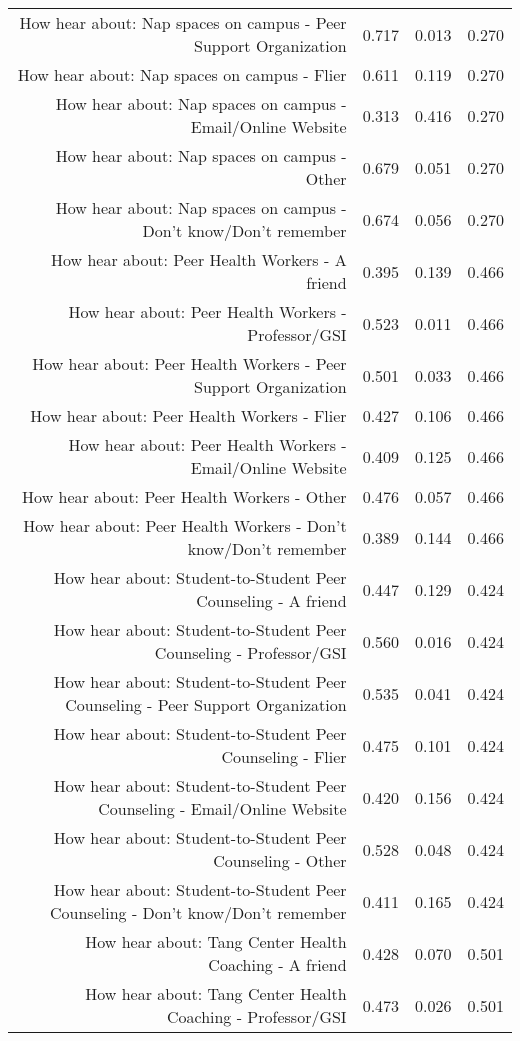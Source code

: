 \documentclass{article}\usepackage[]{graphicx}\usepackage[]{color}
\begin{document}
\begin{table}[ht]
\begin{tabular}{rrrr}
  How hear about: Nap spaces on campus - Peer Support Organization & 0.717 & 0.013 & 0.270 \\ 
  How hear about: Nap spaces on campus - Flier & 0.611 & 0.119 & 0.270 \\ 
  How hear about: Nap spaces on campus - Email/Online Website & 0.313 & 0.416 & 0.270 \\ 
  How hear about: Nap spaces on campus - Other & 0.679 & 0.051 & 0.270 \\ 
  How hear about: Nap spaces on campus - Don't know/Don't remember & 0.674 & 0.056 & 0.270 \\ 
  How hear about: Peer Health Workers - A friend & 0.395 & 0.139 & 0.466 \\ 
  How hear about: Peer Health Workers - Professor/GSI & 0.523 & 0.011 & 0.466 \\ 
  How hear about: Peer Health Workers - Peer Support Organization & 0.501 & 0.033 & 0.466 \\ 
  How hear about: Peer Health Workers - Flier & 0.427 & 0.106 & 0.466 \\ 
  How hear about: Peer Health Workers - Email/Online Website & 0.409 & 0.125 & 0.466 \\ 
  How hear about: Peer Health Workers - Other & 0.476 & 0.057 & 0.466 \\ 
  How hear about: Peer Health Workers - Don't know/Don't remember & 0.389 & 0.144 & 0.466 \\ 
  How hear about: Student-to-Student Peer Counseling - A friend & 0.447 & 0.129 & 0.424 \\ 
  How hear about: Student-to-Student Peer Counseling - Professor/GSI & 0.560 & 0.016 & 0.424 \\ 
  How hear about: Student-to-Student Peer Counseling - Peer Support Organization & 0.535 & 0.041 & 0.424 \\ 
  How hear about: Student-to-Student Peer Counseling - Flier & 0.475 & 0.101 & 0.424 \\ 
  How hear about: Student-to-Student Peer Counseling - Email/Online Website & 0.420 & 0.156 & 0.424 \\ 
  How hear about: Student-to-Student Peer Counseling - Other & 0.528 & 0.048 & 0.424 \\ 
  How hear about: Student-to-Student Peer Counseling - Don't know/Don't remember & 0.411 & 0.165 & 0.424 \\ 
  How hear about: Tang Center Health Coaching - A friend & 0.428 & 0.070 & 0.501 \\ 
  How hear about: Tang Center Health Coaching - Professor/GSI & 0.473 & 0.026 & 0.501 \\ 

\end{tabular}
\end{table}
\end{document}
